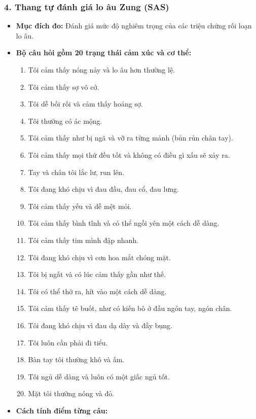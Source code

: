 \documentclass[12pt,a4paper]{article}
\begin{document}
\subsubsection*{4. Thang tự đánh giá lo âu Zung (SAS)}
\begin{itemize}
    \item \textbf{Mục đích đo:} Đánh giá mức độ nghiêm trọng của các triệu chứng rối loạn lo âu.
    \item \textbf{Bộ câu hỏi gồm 20 trạng thái cảm xúc và cơ thể:}
    \begin{enumerate}
        \item Tôi cảm thấy nóng nảy và lo âu hơn thường lệ.
        \item Tôi cảm thấy sợ vô cớ.
        \item Tôi dễ bối rối và cảm thấy hoảng sợ.
        \item Tôi thường có ác mộng.
        \item Tôi cảm thấy như bị ngã và vỡ ra từng mảnh (bủn rủn chân tay).
        \item Tôi cảm thấy mọi thứ đều tốt và không có điều gì xấu sẽ xảy ra.
        \item Tay và chân tôi lắc lư, run lên.
        \item Tôi đang khó chịu vì đau đầu, đau cổ, đau lưng.
        \item Tôi cảm thấy yếu và dễ mệt mỏi.
        \item Tôi cảm thấy bình tĩnh và có thể ngồi yên một cách dễ dàng.
        \item Tôi cảm thấy tim mình đập nhanh.
        \item Tôi đang khó chịu vì cơn hoa mắt chóng mặt.
        \item Tôi bị ngất và có lúc cảm thấy gần như thế.
        \item Tôi có thể thở ra, hít vào một cách dễ dàng.
        \item Tôi cảm thấy tê buốt, như có kiến bò ở đầu ngón tay, ngón chân.
        \item Tôi đang khó chịu vì đau dạ dày và đầy bụng.
        \item Tôi luôn cần phải đi tiểu.
        \item Bàn tay tôi thường khô và ấm.
        \item Tôi ngủ dễ dàng và luôn có một giấc ngủ tốt.
        \item Mặt tôi thường nóng và đỏ.
    \end{enumerate}
    \item \textbf{Cách tính điểm từng câu:}

\end{itemize}
\end{document}

